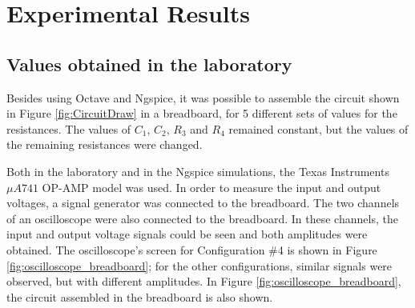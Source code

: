 \section{Experimental Results} \label{sec:experimental}

\subsection{Values obtained in the laboratory} \label{subsec:experimental_measuredvalues}

Besides using Octave and Ngspice, it was possible to assemble the circuit shown in Figure \ref{fig:CircuitDraw} in a breadboard, for 5 different sets of values for the resistances. The values of $C_1$, $C_2$, $R_3$ and $R_4$ remained constant, but the values of the remaining resistances were changed.
\par
Both in the laboratory and in the Ngspice simulations, the Texas Instruments $\mu A741$ OP-AMP model was used. In order to measure the input and output voltages, a signal generator was connected to the breadboard. The two channels of an oscilloscope were also connected to the breadboard. In these channels, the input and output voltage signals could be seen and both amplitudes were obtained. The oscilloscope's screen for Configuration $\#$4 is shown in Figure \ref{fig:oscilloscope_breadboard}; for the other configurations, similar signals were observed, but with different amplitudes. In Figure \ref{fig:oscilloscope_breadboard}, the circuit assembled in the breadboard is also shown.

